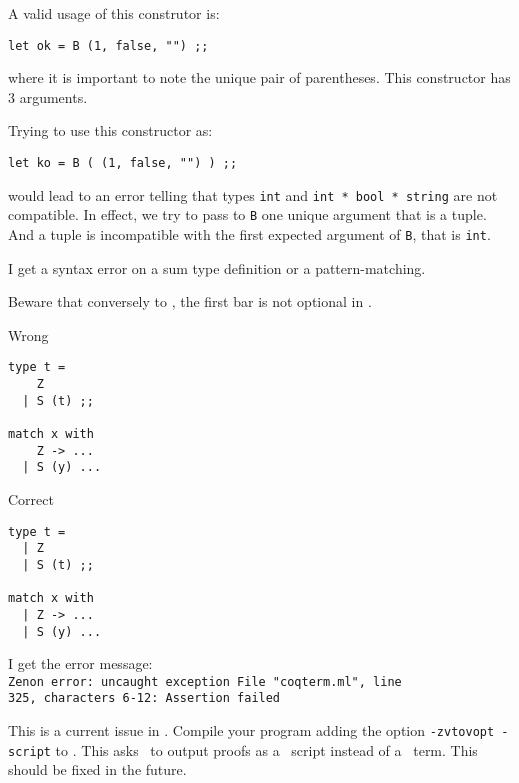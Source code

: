 \documentclass[10pt,a4paper]{article}
\begin{document}
\begin{faqitem}
A valid usage of this construtor is:
{\small
\begin{lstlisting}
let ok = B (1, false, "") ;;
\end{lstlisting}}

\noindent where it is important to note the unique pair of parentheses. This
constructor has 3 arguments.

Trying to use this constructor as:

{\small
\begin{lstlisting}
let ko = B ( (1, false, "") ) ;;
\end{lstlisting}}

\noindent would lead to an error telling that types {\tt int} and
{\tt int * bool * string} are not compatible. In effect, we try to pass to
{\tt B} one unique argument that is a tuple. And a tuple is incompatible with
the first expected argument of {\tt B}, that is {\tt int}.
\end{faqitem}



\bigskip
\begin{faqitem}
I get a syntax error on a sum type definition or a pattern-matching.

\medskip
{}
Beware that conversely to \ocaml, the first bar is not optional in \focal.

\begin{minipage}{6.2cm}
Wrong
{\small
\begin{lstlisting}
type t =
    Z
  | S (t) ;;

match x with
    Z -> ...
  | S (y) ...
\end{lstlisting}}
\end{minipage}\hskip1cm
\begin{minipage}{6.2cm}
Correct
{\small
\begin{lstlisting}
type t =
  | Z
  | S (t) ;;

match x with
  | Z -> ...
  | S (y) ...
\end{lstlisting}}
\end{minipage}
\end{faqitem}



\bigskip
\begin{faqitem}
I get the error message:\\
  \verb+Zenon error: uncaught exception File "coqterm.ml", line +\\
  \verb+325, characters 6-12: Assertion failed+

\medskip
{}
This is a current issue in \zenon. Compile your program
adding the option \verb+-zvtovopt -script+ to \focalizec. This asks
\zenon\ to output proofs as a \coq\ script instead of a \coq\ term. This should
be fixed in the future.
\end{faqitem}
\end{document}
